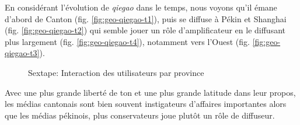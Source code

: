 En considérant l{\textquoteright}évolution de \textit{qiegao} dans le temps, nous voyons qu{\textquoteright}il émane d{\textquoteright}abord de Canton (fig. \ref{fig:geo-qiegao-t1}), puis se diffuse \`a Pékin et Shanghai (fig. \ref{fig:geo-qiegao-t2}) qui semble jouer un r\^ole d{\textquoteright}amplificateur en le diffusant plus largement (fig. \ref{fig:geo-qiegao-t4}), notamment vers l{\textquoteright}Ouest (fig. \ref{fig:geo-qiegao-t3}).  

\begin{figure}[h!]
    \centering
    
  \caption{
    Sextape: Interaction des utilisateurs par province
  }
\end{figure}

Avec une plus grande liberté de ton et une plus grande latitude dans leur propos, les médias cantonais sont bien souvent instigateurs d{\textquoteright}affaires importantes alors que les médias pékinois, plus conservateurs joue plut\^ot un r\^ole de diffuseur. 

